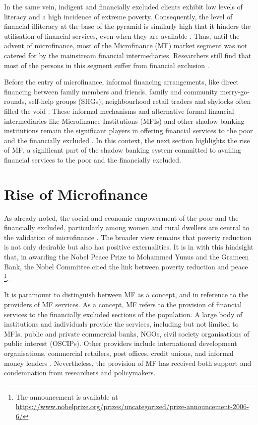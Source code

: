 \documentclass[a4paper,nobind]{templates/ociamthesis}
\begin{document}
In the same vein, indigent and financially excluded clients exhibit low levels of literacy and a high incidence of extreme poverty. Consequently, the level of financial illiteracy at the base of the pyramid is similarly high that it hinders the utilisation of financial services, even when they are available \autocite{engstrom2017financial}. Thus, until the advent of microfinance, most of the Microfinance (MF) market segment was not catered for by the mainstream financial intermediaries. Researchers still find that most of the persons in this segment suffer from financial exclusion \autocite{kota2007microfinance}.

Before the entry of microfinance, informal financing arrangements, like direct financing between family members and friends, family and community merry-go-rounds, self-help groups (SHGs), neighbourhood retail traders and shylocks often filled the void \autocite{klapper2015role}. These informal mechanisms and alternative formal financial intermediaries like Microfinance Institutions (MFIs) and other shadow banking institutions remain the significant players in offering financial services to the poor and the financially excluded \autocite{klapper2015role}. In this context, the next section highlights the rise of MF, a significant part of the shadow banking system committed to availing financial services to the poor and the financially excluded.

\hypertarget{rise-of-microfinance}{%
\section{Rise of Microfinance}\label{rise-of-microfinance}}

\noindent As already noted, the social and economic empowerment of the poor and the financially excluded, particularly among women and rural dwellers are central to the validation of microfinance \autocite{engstrom2017financial}. The broader view remains that poverty reduction is not only desirable but also has positive externalities. It is in with this hindsight that, in awarding the Nobel Peace Prize to Mohammed Yunus and the Grameen Bank, the Nobel Committee cited the link between poverty reduction and peace \footnote{The announcement is available at \url{https://www.nobelprize.org/prizes/uncategorized/prize-announcement-2006-6/}}.

It is paramount to distinguish between MF as a concept, and in reference to the providers of MF services. As a concept, MF refers to the provision of financial services to the financially excluded sections of the population. A large body of institutions and individuals provide the services, including but not limited to MFIs, public and private commercial banks, NGOs, civil society organisations of public interest (OSCIPs). Other providers include international development organisations, commercial retailers, post offices, credit unions, and informal money lenders \autocite{ledgerwood2006transforming,marconatto2016going}. Nevertheless, the provision of MF has received both support and condemnation from researchers and policymakers.
\end{document}
